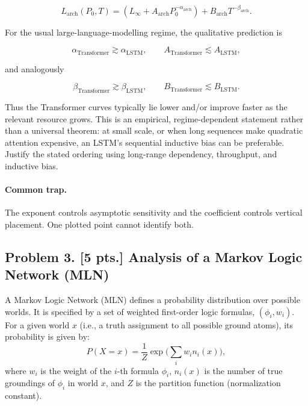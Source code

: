 \documentclass[11pt,a4paper]{article}
\begin{document}
\[
L_{\mathrm{arch}}(P_0,T)
=\left(L_\infty+A_{\mathrm{arch}}P_0^{-\alpha_{\mathrm{arch}}}\right)
+B_{\mathrm{arch}}T^{-\beta_{\mathrm{arch}}}.
\]

For the usual large-language-modelling regime, the qualitative prediction is

\[
\alpha_{\mathrm{Transformer}}\gtrsim\alpha_{\mathrm{LSTM}},
\qquad
A_{\mathrm{Transformer}}\lesssim A_{\mathrm{LSTM}},
\]

and analogously

\[
\beta_{\mathrm{Transformer}}\gtrsim\beta_{\mathrm{LSTM}},
\qquad
B_{\mathrm{Transformer}}\lesssim B_{\mathrm{LSTM}}.
\]

Thus the Transformer curves typically lie lower and/or improve faster as the relevant resource grows. This is an empirical, regime-dependent statement rather than a universal theorem: at small scale, or when long sequences make quadratic attention expensive, an LSTM's sequential inductive bias can be preferable. Justify the stated ordering using long-range dependency, throughput, and inductive bias.

\paragraph{Common trap.}

The exponent controls asymptotic sensitivity and the coefficient controls vertical placement. One plotted point cannot identify both.



\subsection{Problem 3. [5 pts.] Analysis of a Markov Logic Network (MLN)}
A Markov Logic Network (MLN) defines a probability distribution over possible worlds. It is specified by a set of weighted first-order logic formulas, $(\phi_i, w_i)$. For a given world $x$ (i.e., a truth assignment to all possible ground atoms), its probability is given by:
\[
P(X = x) = \frac{1}{Z} \exp\Biggl( \sum_i w_i n_i(x) \Biggr),
\]
where $w_i$ is the weight of the $i$-th formula $\phi_i$, $n_i(x)$ is the number of true groundings of $\phi_i$ in world $x$, and $Z$ is the partition function (normalization constant).
\end{document}
